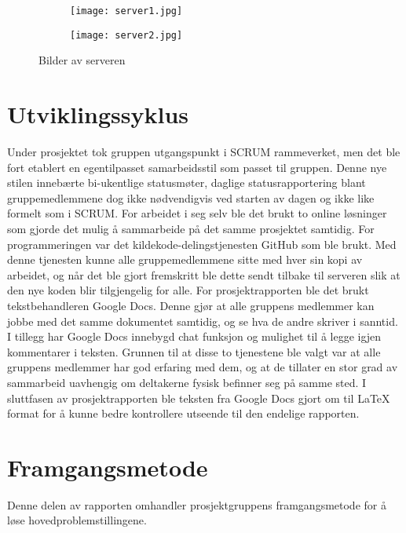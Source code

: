\documentclass[../main.tex]{subfiles}
\begin{document}
\begin{figure}[h!]
        \centering
        \begin{subfigure}[b]{7cm}
                \centering
                \texttt{[image: server1.jpg]}

        \end{subfigure}
        \begin{subfigure}[b]{7cm}
                \centering
                \texttt{[image: server2.jpg]}

        \end{subfigure}
        \caption{Bilder av serveren}
\end{figure}

\section{Utviklingssyklus}
Under prosjektet tok gruppen utgangspunkt i SCRUM rammeverket, men det ble fort etablert en egentilpasset samarbeidsstil som passet til gruppen. Denne nye stilen innebærte bi-ukentlige statusmøter, daglige statusrapportering blant gruppemedlemmene dog ikke nødvendigvis ved starten av dagen og ikke like formelt som i SCRUM.\newline
\newline
For arbeidet i seg selv ble det brukt to online løsninger som gjorde det mulig å sammarbeide på det samme prosjektet samtidig. For programmeringen var det kildekode-delingstjenesten GitHub som ble brukt. Med denne tjenesten kunne alle gruppemedlemmene sitte med hver sin kopi av arbeidet, og når det ble gjort fremskritt ble dette sendt tilbake til serveren slik at den nye koden blir tilgjengelig for alle. \newline
For prosjektrapporten ble det brukt tekstbehandleren Google Docs. Denne gjør at alle gruppens medlemmer kan jobbe med det samme dokumentet samtidig, og se hva de andre skriver i sanntid. I tillegg har Google Docs innebygd chat funksjon og mulighet til å legge igjen kommentarer i teksten. Grunnen til at disse to tjenestene ble valgt var at alle gruppens medlemmer har god erfaring med dem, og at de tillater en stor grad av sammarbeid uavhengig om deltakerne fysisk befinner seg på samme sted. I sluttfasen av prosjektrapporten ble teksten fra Google Docs gjort om til LaTeX format for å kunne bedre kontrollere utseende til den endelige rapporten.

\section{Framgangsmetode}
Denne delen av rapporten omhandler prosjektgruppens framgangsmetode for å løse hovedproblemstillingene.
\end{document}

